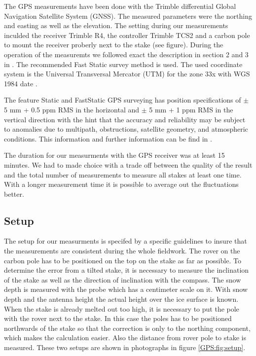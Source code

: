 The GPS measurements have been done with the Trimble differential Global Navigation Satellite System (GNSS). 
The measured parameters were the northing and easting as well as the elevation.
The setting during our measurements inculded the receiver Trimble R4, the controller Trimble TCS2 and a carbon pole to mount the receiver proberly next to the stake (see figure).
During the operation of the measuremts we followed exact the description in section 2 and 3 in \cite{Trquickstart}. 
The recommended Fast Static survey method is used.
The used coordinate system is the Universal Transversal Mercator (UTM) for the zone 33x with WGS 1984 date  \citep{Trquickstart}. 

The feature Static and FastStatic GPS surveying has position specifications of $ \pm $ 5 mm + 0.5 ppm RMS in the horizontal and $ \pm $ 5 mm + 1 ppm RMS in the vertical direction with the hint that the accuracy and reliability may be subject to anomalies due to multipath, obstructions, satellite geometry, and atmospheric conditions.
This information and further information can be find in \cite{Truserguide}.
\medskip

The duration for our measurments with the GPS receiver was at least 15 minutes. 
We had to made choice with a trade off between the quality of the result and the total number of measurements to measure all stakes at least one time. 
With a longer measurement time it is possible to average out the fluctuations better.


\subsection{Setup}

The setup for our measurments is specifed by a specific guidelines to insure that the measurements are consistent during the whole fieldwork.
The rover on the carbon pole has to be positioned on the top on the stake as far as possible. 
To determine the error from a tilted stake, it is necessary to measure the inclination of the stake as well as the direction of inclination with the compass.
The snow depth is measured with the probe which has a centimeter scale on it.
With snow depth and the antenna height the actual height over the ice surface is known. 
When the stake is already melted out too high, it is necessary to put the pole with the rover next to the stake. 
In this case the poles has to be positioned northwards of the stake so that the correction is only to the northing component, which makes the calculation easier. 
Also the distance from rover pole to stake is measured.
These two setups are shown in photographs in figure \ref{GPS:fig:setup}.

